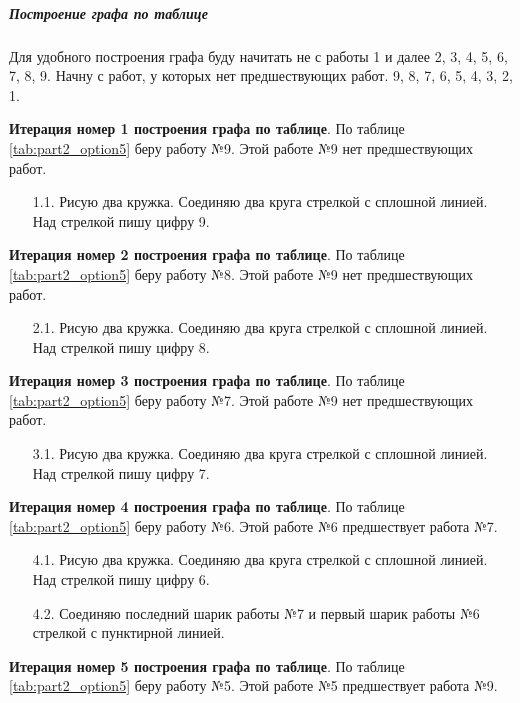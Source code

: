 \subparagraph{Построение графа по таблице} \hspace{0pt}

Для удобного построения графа буду начитать не с работы 1 и далее 2, 3, 4, 5, 6, 7, 8, 9. Начну с работ, у которых нет предшествующих работ. 9, 8, 7, 6, 5, 4, 3, 2, 1.

\textbf{Итерация номер 1 построения графа по таблице}. По таблице \ref{tab:part2_option5} беру работу №9. Этой работе №9 нет предшествующих работ.

\begin{enumerate}
  \item[1.1.] Рисую два кружка. Соединяю два круга стрелкой с сплошной линией. Над стрелкой пишу цифру 9.
\end{enumerate}

\textbf{Итерация номер 2 построения графа по таблице}. По таблице \ref{tab:part2_option5} беру работу №8. Этой работе №9 нет предшествующих работ.

\begin{enumerate}
  \item[2.1.] Рисую два кружка. Соединяю два круга стрелкой с сплошной линией. Над стрелкой пишу цифру 8.
\end{enumerate}

\textbf{Итерация номер 3 построения графа по таблице}. По таблице \ref{tab:part2_option5} беру работу №7. Этой работе №9 нет предшествующих работ.

\begin{enumerate}
  \item[3.1.] Рисую два кружка. Соединяю два круга стрелкой с сплошной линией. Над стрелкой пишу цифру 7.
\end{enumerate}

\textbf{Итерация номер 4 построения графа по таблице}. По таблице \ref{tab:part2_option5} беру работу №6. Этой работе №6 предшествует работа №7.

\begin{enumerate}
  \item[4.1.] Рисую два кружка. Соединяю два круга стрелкой с сплошной линией. Над стрелкой пишу цифру 6.
  \item[4.2.] Соединяю последний шарик работы №7 и первый шарик работы №6 стрелкой с пунктирной линией.
\end{enumerate}

\textbf{Итерация номер 5 построения графа по таблице}. По таблице \ref{tab:part2_option5} беру работу №5. Этой работе №5 предшествует работа №9.

